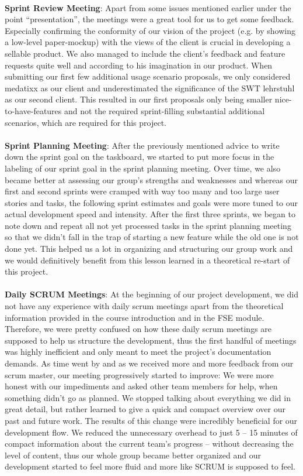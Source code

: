 \ \\
\textbf{Sprint Review Meeting}: Apart from some issues mentioned earlier under the point “presentation”, the meetings were a great tool for us to get some feedback. Especially confirming the conformity of our vision of the project (e.g. by showing a low-level paper-mockup) with the views of the client is crucial in developing a sellable product. We also managed to include the client’s feedback and feature requests quite well and according to his imagination in our product. When submitting our first few additional usage scenario proposals, we only considered medatixx as our client and underestimated the significance of the SWT lehrstuhl as our second client. This resulted in our first proposals only being smaller nice-to-have-features and not the required sprint-filling substantial additional scenarios, which are required for this project. \\
\ \\
\textbf{Sprint Planning Meeting}: After the previously mentioned advice to write down the sprint goal on the taskboard, we started to put more focus in the labeling of our sprint goal in the sprint planning meeting. Over time, we also became better at assessing our group’s strengths and weaknesses and whereas our first and second sprints were cramped with way too many and too large user stories and tasks, the following sprint estimates and goals were more tuned to our actual development speed and intensity. After the first three sprints, we began to note down and repeat all not yet processed tasks in the sprint planning meeting so that we didn’t fall in the trap of starting a new feature while the old one is not done yet. This helped us a lot in organizing and structuring our group work and we would definitively benefit from this lesson learned in a theoretical re-start of this project.\\
\ \\
\textbf{Daily SCRUM Meetings}: At the beginning of our project development, we did not have any experience with daily scrum meetings apart from the theoretical information provided in the course introduction and in the FSE module. Therefore, we were pretty confused on how these daily scrum meetings are supposed to help us structure the development, thus the first handful of meetings was highly inefficient and only meant to meet the project’s documentation demands. As time went by and as we received more and more feedback from our scrum master, our meeting progressively started to improve: We were more honest with our impediments and asked other team members for help, when something didn’t go as planned. We stopped talking about everything we did in great detail, but rather learned to give a quick and compact overview over our past and future work. The results of this change were incredibly beneficial for our development flow. We reduced the unnecessary overhead to just 5 – 15 minutes of compact information about the current team’s progress – without decreasing the level of content, thus our whole group became better organized and our development started to feel more fluid and more like SCRUM is supposed to feel. \\
